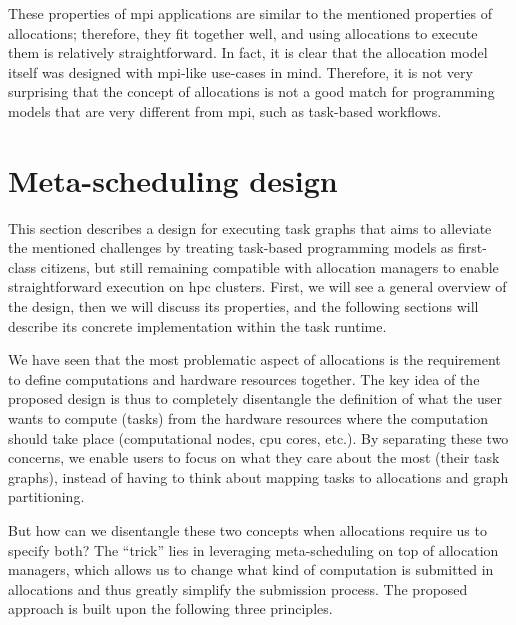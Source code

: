 These properties of \gls{mpi} applications are similar to the mentioned properties of
allocations; therefore, they fit together well, and using allocations to execute them is relatively
straightforward. In fact, it is clear that the allocation model itself was designed with
\gls{mpi}-like use-cases in mind. Therefore, it is not very surprising that the
concept of allocations is not a good match for programming models that are very different from
\gls{mpi}, such as task-based workflows.


\section{Meta-scheduling design}
This section describes a design for executing task graphs that aims to alleviate the mentioned
challenges by treating task-based programming models as first-class citizens, but still remaining
compatible with allocation managers to enable straightforward execution on \gls{hpc}
clusters. First, we will see a general overview of the design, then we will discuss its properties,
and the following sections will describe its concrete implementation within the
\hyperqueue{} task runtime.

We have seen that the most problematic aspect of allocations is the requirement to define
computations and hardware resources together. The key idea of the proposed design is thus to
completely disentangle the definition of what the user wants to compute (tasks) from the hardware
resources where the computation should take place (computational nodes, \gls{cpu}
cores, etc.). By separating these two concerns, we enable users to focus on what they care about
the most (their task graphs), instead of having to think about mapping tasks to allocations and
graph partitioning.

But how can we disentangle these two concepts when allocations require us to specify both? The
``trick'' lies in leveraging meta-scheduling on top of allocation managers, which allows us to
change what kind of computation is submitted in allocations and thus greatly simplify the
submission process. The proposed approach is built upon the following three principles.

